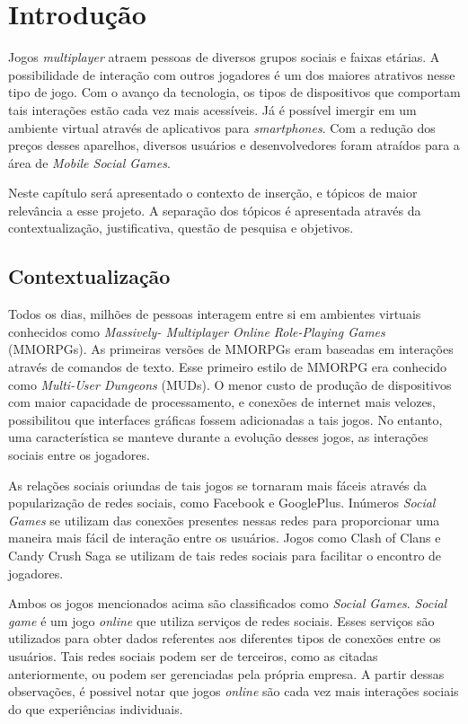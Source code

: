 \chapter[Introdução]{Introdução}

Jogos \textit{multiplayer} atraem pessoas de diversos grupos sociais e faixas etárias. A possibilidade de interação com outros jogadores
é um dos maiores atrativos nesse tipo de jogo. Com o avanço da tecnologia, os tipos de dispositivos que comportam tais interações
estão cada vez mais acessíveis. Já é possível imergir em um ambiente virtual através de aplicativos para \textit{smartphones}. Com a
redução dos preços desses aparelhos, diversos usuários e desenvolvedores foram atraídos para a área de \textit{Mobile Social Games}.

Neste capítulo será apresentado o contexto de inserção, e tópicos de maior
relevância a esse projeto. A separação dos tópicos é apresentada através da
contextualização, justificativa, questão de pesquisa e objetivos.


\section{Contextualização}

Todos os dias, milhões de pessoas interagem entre si em ambientes virtuais conhecidos como
\textit{Massively- Multiplayer Online Role-Playing Games} (MMORPGs)\cite{nick2006}. As primeiras versões de MMORPGs eram baseadas em
interações através de comandos de texto. Esse primeiro estilo de MMORPG era conhecido como \textit{Multi-User Dungeons} (MUDs)\cite{edward1997}.
O menor custo de produção de dispositivos com maior capacidade de processamento, e conexões de internet mais velozes,
possibilitou que interfaces gráficas fossem adicionadas a tais jogos. No entanto, uma característica se manteve durante a evolução desses jogos,
as interações sociais entre os jogadores.

As relações sociais oriundas de tais jogos se tornaram mais fáceis através da popularização de redes sociais, como Facebook e GooglePlus.
Inúmeros \textit{Social Games} se utilizam das conexões presentes nessas redes para proporcionar uma maneira mais fácil de interação entre
os usuários. Jogos como Clash of Clans\cite{clashOfClans} e Candy Crush Saga\cite{candyCrush} se utilizam de tais redes sociais para facilitar
o encontro de jogadores.

Ambos os jogos mencionados acima são classificados como \textit{Social Games}. \textit{Social game} é um jogo \textit{online} que utiliza servi\c{c}os de redes sociais\cite{park2012}.
Esses serviços são utilizados para obter dados referentes aos diferentes tipos de conexões entre os usuários. Tais redes sociais podem ser de terceiros,
como as citadas anteriormente, ou podem ser gerenciadas pela própria empresa. A partir dessas observações, é possivel notar que
jogos \textit{online} são cada vez mais interações sociais do que experi\^encias individuais\cite{king2003}.


